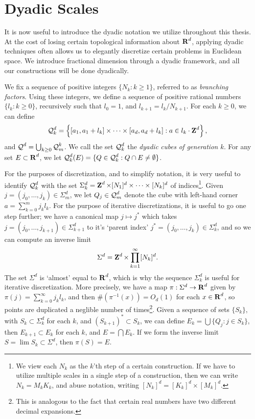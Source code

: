\section{Dyadic Scales}

It is now useful to introduce the dyadic notation we utilize throughout this thesis. At the cost of losing certain topological information about $\operatorname{\mathbf{R}}^d$, applying dyadic techniques often allows us to elegantly discretize certain problems in Euclidean space. We introduce fractional dimension through a dyadic framework, and all our constructions will be done dyadically.

We fix a sequence of positive integers $\{ N_k : k \geq 1 \}$, referred to as \emph{branching factors}. Using these integers, we define a sequence of positive rational numbers $\{ l_k : k \geq 0 \}$, recursively such that $l_0 = 1$, and $l_{k+1} = l_k/N_{k+1}$. For each $k \geq 0$, we can define
%
\[ \operatorname{\mathcal{Q}}_k^d = \left\{ [ a_1, a_1 + l_k ] \times \dots \times [ a_d, a_d + l_k ] : a \in l_k \cdot \operatorname{\mathbf{Z}}^d \right\}, \]
%
and $\operatorname{\mathcal{Q}}^d = \bigcup_{k \geq 0} \operatorname{\mathcal{Q}}_m^k$. We call the set $\operatorname{\mathcal{Q}}_k^d$ the \emph{dyadic cubes of generation $k$}. For any set $E \subset \operatorname{\mathbf{R}}^d$, we let $\operatorname{\mathcal{Q}}_k^d(E) = \{ Q \in \operatorname{\mathcal{Q}}_k^d : Q \cap E \neq \emptyset \}$.

For the purposes of discretization, and to simplify notation, it is very useful to identify $\operatorname{\mathcal{Q}}_k^d$ with the set $\Sigma_k^d = \operatorname{\mathbf{Z}}^d \times [N_1]^d \times \dots \times [N_k]^d$ of indices\footnote{We view each $N_k$ as the $k$'th step of a certain construction. If we have to utilize multiple scales in a single step of a construction, then we can write $N_k = M_k K_k$, and abuse notation, writing $[N_k]^d = [K_k]^d \times [M_k]^d$.}. Given $j = (j_0, \dots, j_k) \in \Sigma_m^d$, we let $Q_j \in \operatorname{\mathcal{Q}}_m^d$ denote the cube with left-hand corner $a = \sum_{k = 0}^m j_kl_k$. For the purpose of iterative discretizations, it is useful to go one step further; we have a canonical map $j \mapsto j^*$ which takes $j = (j_0, \dots, j_{k+1}) \in \Sigma_{k+1}^d$ to it's `parent index' $j^* = (j_0, \dots, j_k) \in \Sigma_k^d$, and so we can compute an inverse limit
%
\[ \Sigma^d = \operatorname{\mathbf{Z}}^d \times \prod_{k = 1}^\infty [N_k]^d. \]
%
The set $\Sigma^d$ is `almost' equal to $\operatorname{\mathbf{R}}^d$, which is why the sequence $\Sigma_k^d$ is useful for iterative discretization. More precisely, we have a map $\pi: \Sigma^d \to \operatorname{\mathbf{R}}^d$ given by $\pi(j) = \sum_{k = 0}^\infty j_kl_k$, and then $\#(\pi^{-1}(x)) = O_d(1)$ for each $x \in \operatorname{\mathbf{R}}^d$, so points are duplicated a neglible number of times\footnote{This is analogous to the fact that certain real numbers have two different decimal expansions.}. Given a sequence of sets $\{ S_k \}$, with $S_k \subset \Sigma_k^d$ for each $k$, and $(S_{k+1})^* \subset S_k$, we can define $E_k = \bigcup \{ Q_j : j \in S_k \}$, then $E_{k+1} \subset E_k$ for each $k$, and $E = \bigcap E_k$. If we form the inverse limit $S = \lim S_k \subset \Sigma^d$, then $\pi(S) = E$.

